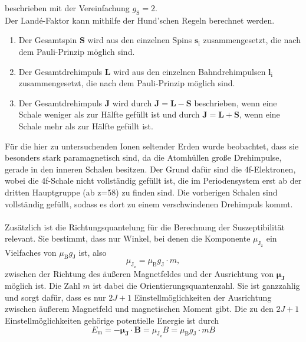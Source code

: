     beschrieben mit der Vereinfachung $g_\text{S} = 2$.\\
    Der Landé-Faktor kann mithilfe der Hund'schen Regeln berechnet werden.
    \begin{enumerate}
        \item Der Gesamtspin $\symbf{S}$ wird aus den einzelnen Spins $\symbf{s}_\text{i}$ zusammengesetzt, 
        die nach dem Pauli-Prinzip möglich sind.
        \item Der Gesamtdrehimpuls $\symbf{L}$ wird aus den einzelnen Bahndrehimpulsen $\symbf{l}_\text{i}$ zusammengesetzt, 
        die nach dem Pauli-Prinzip möglich sind.
        \item Der Gesamtdrehimpuls $\symbf{J}$ wird durch $\symbf{J} = \symbf{L} - \symbf{S}$ beschrieben,
        wenn eine Schale weniger als zur Hälfte gefüllt ist und durch $\symbf{J} = \symbf{L} + \symbf{S}$,
        wenn eine Schale mehr als zur Hälfte gefüllt ist.
    \end{enumerate}
    Für die hier zu untersuchenden Ionen seltender Erden wurde beobachtet,
    dass sie besonders stark paramagnetisch sind,
    da die Atomhüllen große Drehimpulse, 
    gerade in den inneren Schalen besitzen.
    Der Grund dafür sind die 4f-Elektronen,
    wobei die 4f-Schale nicht vollständig gefüllt ist, 
    die im Periodensystem erst ab der dritten Hauptgruppe (ab z=58) zu finden sind.
    Die vorherigen Schalen sind vollständig gefüllt,
    sodass es dort zu einem verschwindenen Drehimpuls kommt.\\
    \\
    Zusätzlich ist die Richtungsquantelung für die Berechnung der Suszeptibilität relevant.
    Sie bestimmt, 
    dass nur Winkel,
    bei denen die Komponente $\mu_{\text{J}_\text{z}}$ ein Vielfaches von $\mu_\text{B} g_\text{J}$ ist,
    also 
    \begin{equation}
        \mu_{\text{J}_\text{z}} = \mu_\text{B} g_\text{J} \cdot m ,
    \end{equation}
    zwischen der Richtung des äußeren Magnetfeldes und der Ausrichtung von $\symbf{\mu_\text{J}}$ möglich ist.
    Die Zahl $m$ ist dabei die Orientierungsquantenzahl.
    Sie ist ganzzahlig und sorgt dafür,
    dass es nur $2J+1$ Einstellmöglichkeiten der Ausrichtung zwischen äußerem Magnetfeld und magnetischen Moment gibt.
    Die zu den $2J+1$ Einstellmöglichkeiten gehörige potentielle Energie ist durch
    \begin{equation}
        E_\text{m} = - \symbf{\mu_\text{J}} \cdot \symbf{B} = \mu_{\text{J}_\text{z}} B = \mu_\text{B} g_\text{J} \cdot m B
    \end{equation} %
